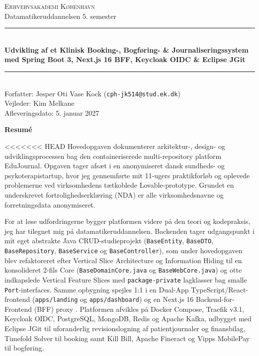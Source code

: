 \documentclass[11pt,a4paper]{article}
\begin{document}
\begin{titlepage}
    \centering
    \vspace*{0.8cm}
    {\Large \textsc{Erhvervsakademi København}}\\[0.3cm]
    {\large Datamatikeruddannelsen 5. semester}\\[0.9cm]

    \rule{\textwidth}{1.2pt}\\[0.45cm]
    {\LARGE \bfseries Udvikling af et Klinisk Booking-, Bogføring- \& Journaliseringssystem med Spring Boot 3, Next.js 16 BFF, Keycloak OIDC \& Eclipse JGit}\\[0.35cm]
    \rule{\textwidth}{1.2pt}\\[0.8cm]

    {\large
    Forfatter: Jesper Oti Vase Kock (\texttt{cph-jk514@stud.ek.dk})\\[0.2cm]
    Vejleder: Kim Melkane\\[0.2cm]
    Afleveringsdato: 5. januar 2027
    }\\[0.9cm]

    \begin{minipage}{0.92\textwidth}
        \begin{center}
            \textbf{\large Resumé}
        \end{center}
        \small
<<<<<<< HEAD
        Hovedopgaven dokumenterer arkitektur-, design- og udviklingsprocessen bag den containeriserede multi-repository platform EduJournal. Opgaven tager afsæt i en anonymiseret dansk sundheds- og psykoterapistartup, hvor jeg gennemførte mit 11-ugers praktikforløb og oplevede problemerne ved virksomhedens tætkoblede Lovable-prototype. Grundet en underskrevet fortrolighedserklæring (NDA) er alle virksomhedsnavne og forretningsdata anonymiseret.

        For at løse udfordringerne bygger platformen videre på den teori og kodepraksis, jeg har tilegnet mig på datamatikeruddannelsen. Backenden tager udgangspunkt i mit eget abstrakte Java CRUD-studieprojekt (\texttt{BaseEntity}, \texttt{BaseDTO}, \texttt{BaseRepository}, \texttt{BaseService} og \texttt{BaseController}), som under hovedopgaven blev refaktoreret efter Vertical Slice Architecture \cite{bogard2018} og Information Hiding \cite{parnas1972} til en konsolideret 2-fils Core (\texttt{BaseDomainCore.java} og \texttt{BaseWebCore.java}) og otte indkapslede Vertical Feature Slices med \texttt{package-private} lagklasser bag smalle \texttt{Port}-interfaces. Samme opbygning spejles 1:1 i en Dual-App TypeScript/React-frontend (\texttt{apps/landing} og \texttt{apps/dashboard}) og en Next.js 16 Backend-for-Frontend (BFF) proxy \cite{newman2021}. Platformen afvikles på Docker Compose, Traefik v3.1, Keycloak OIDC, PostgreSQL, MongoDB, Redis og Apache Kafka, udbygget med Eclipse JGit \cite{jgit2024} til uforanderlig revisionslogning af patientjournaler og finansbilag, Timefold Solver til booking samt Kill Bill, Apache Fineract og Vipps MobilePay til bogføring.


\end{minipage}
\end{titlepage}
\end{document}
